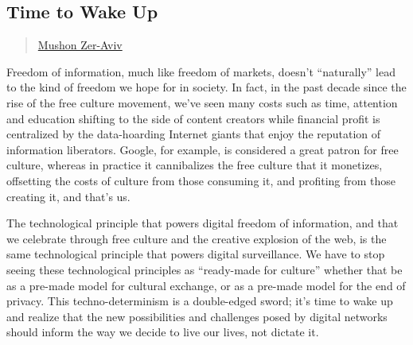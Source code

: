 \subsection{Time to Wake Up}\label{time-to-wake-up}

\begin{quote}
\hyperlink{mushon-zer-aviv}{Mushon Zer-Aviv}
\end{quote}

Freedom of information, much like freedom of markets, doesn't
``naturally'' lead to the kind of freedom we hope for in society. In
fact, in the past decade since the rise of the free culture movement,
we've seen many costs such as time, attention and education shifting to
the side of content creators while financial profit is centralized by
the data-hoarding Internet giants that enjoy the reputation of
information liberators. Google, for example, is considered a great
patron for free culture, whereas in practice it cannibalizes the free
culture that it monetizes, offsetting the costs of culture from those
consuming it, and profiting from those creating it, and that's us.

The technological principle that powers digital freedom of information,
and that we celebrate through free culture and the creative explosion of
the web, is the same technological principle that powers digital
surveillance. We have to stop seeing these technological principles as
``ready-made for culture'' whether that be as a pre-made model for
cultural exchange, or as a pre-made model for the end of privacy. This
techno-determinism is a double-edged sword; it's time to wake up and
realize that the new possibilities and challenges posed by digital
networks should inform the way we decide to live our lives, not dictate
it.
